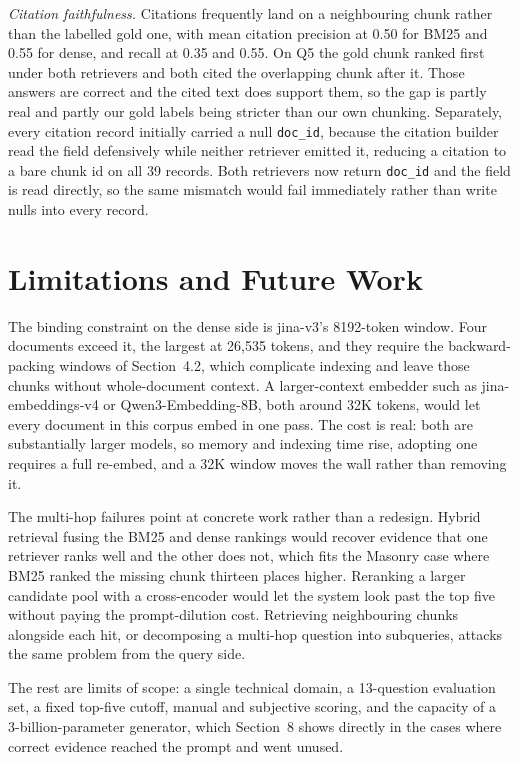 \documentclass[10pt,a4paper]{article}
\begin{document}
\textit{Citation faithfulness.} Citations frequently land on a neighbouring chunk rather than the labelled gold one, with mean citation precision at 0.50 for BM25 and 0.55 for dense, and recall at 0.35 and 0.55. On Q5 the gold chunk ranked first under both retrievers and both cited the overlapping chunk after it. Those answers are correct and the cited text does support them, so the gap is partly real and partly our gold labels being stricter than our own chunking. Separately, every citation record initially carried a null \texttt{doc\_id}, because the citation builder read the field defensively while neither retriever emitted it, reducing a citation to a bare chunk id on all 39 records. Both retrievers now return \texttt{doc\_id} and the field is read directly, so the same mismatch would fail immediately rather than write nulls into every record.

\section{Limitations and Future Work}

The binding constraint on the dense side is jina-v3's 8192-token window. Four documents exceed it, the largest at 26{,}535 tokens, and they require the backward-packing windows of Section~4.2, which complicate indexing and leave those chunks without whole-document context. A larger-context embedder such as jina-embeddings-v4 or Qwen3-Embedding-8B, both around 32K tokens, would let every document in this corpus embed in one pass. The cost is real: both are substantially larger models, so memory and indexing time rise, adopting one requires a full re-embed, and a 32K window moves the wall rather than removing it.

The multi-hop failures point at concrete work rather than a redesign. Hybrid retrieval fusing the BM25 and dense rankings would recover evidence that one retriever ranks well and the other does not, which fits the Masonry case where BM25 ranked the missing chunk thirteen places higher. Reranking a larger candidate pool with a cross-encoder would let the system look past the top five without paying the prompt-dilution cost. Retrieving neighbouring chunks alongside each hit, or decomposing a multi-hop question into subqueries, attacks the same problem from the query side.

The rest are limits of scope: a single technical domain, a 13-question evaluation set, a fixed top-five cutoff, manual and subjective scoring, and the capacity of a 3-billion-parameter generator, which Section~8 shows directly in the cases where correct evidence reached the prompt and went unused.
\end{document}
